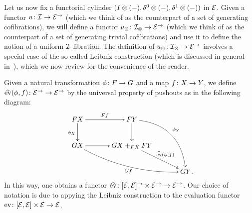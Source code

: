 \documentclass[reqno,10pt,a4paper,oneside,draft]{amsart}
\begin{document}
Let us now fix a functorial cylinder $(\interval \otimes (-), \lcyl \otimes (-), \rcyl \otimes (-))$ in $\calE$.
Given a functor $u \co \cal{I} \to \catE^\to$ (which we think of as the counterpart of a set of generating cofibrations), we will define a functor $u_\otimes \co \cal{I}_\otimes \to \catE^\to$ (which we think of as the counterpart of a set of generating trivial cofibrations) and use it to define the notion of a uniform $\cal{I}$-fibration.
The definition of $u_\otimes \co \cal{I}_\otimes \to \catE^\to$ involves a special case of the so-called Leibniz construction (which is discussed in general in~\cite{riehl-verity:reedy}), which we now review for the convenience of the reader.

Given a natural transformation $\phi \co F \to G$ and a map $f \co X \to Y$, we define $\hateval(\phi, f) \co \catE^\to \to \catE^\to$ by the universal property of pushouts as in the following diagram:
\begin{equation} \label{definition-of-hateval}
\begin{aligned}
\xymatrix@C=1.2cm{
  FX
  \ar[r]^{Ff}
  \ar[d]_{\phi_X}
&
  FY
  \ar@/^2pc/[ddr]^{\phi_Y}
  \ar[d]
&\\
  GX
  \ar@/_1pc/[drr]_{Gf}
  \ar[r]
&
  GX +_{FX} FY
  \ar[dr]^-{\hateval(\phi, f)}
&\\&&
  GY
\rlap{.}}
\end{aligned}
\end{equation}
In this way, one obtains a functor $\hateval \co [\catE, \catE]^\to \times \catE^\to \to \catE^\to$.
Our choice of notation is due to appying the Leibniz construction to the evaluation functor $\eval \co [\catE,\catE] \times \calE \to \catE$.
\end{document}
